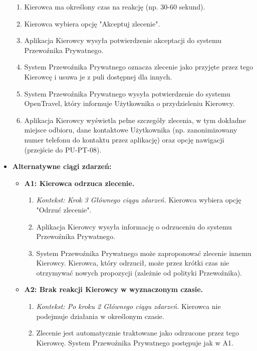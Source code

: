 \documentclass[a4paper,12pt]{article}
\begin{document}
\begin{itemize}
\begin{enumerate}
            \item Kierowca ma określony czas na reakcję (np. 30-60 sekund).
            \item Kierowca wybiera opcję "Akceptuj zlecenie".
            \item Aplikacja Kierowcy wysyła potwierdzenie akceptacji do systemu Przewoźnika Prywatnego.
            \item System Przewoźnika Prywatnego oznacza zlecenie jako przyjęte przez tego Kierowcę i usuwa je z puli dostępnej dla innych.
            \item System Przewoźnika Prywatnego wysyła potwierdzenie do systemu OpenTravel, który informuje Użytkownika o przydzieleniu Kierowcy.
            \item Aplikacja Kierowcy wyświetla pełne szczegóły zlecenia, w tym dokładne miejsce odbioru, dane kontaktowe Użytkownika (np. zanonimizowany numer telefonu do kontaktu przez aplikację) oraz opcję nawigacji (przejście do PU-PT-08).
        \end{enumerate}
    \item \textbf{Alternatywne ciągi zdarzeń:}
        \begin{itemize}
            \item \textbf{A1: Kierowca odrzuca zlecenie.}
                \begin{enumerate}
                    \item \textit{Kontekst: Krok 3 Głównego ciągu zdarzeń.} Kierowca wybiera opcję "Odrzuć zlecenie".
                    \item Aplikacja Kierowcy wysyła informację o odrzuceniu do systemu Przewoźnika Prywatnego.
                    \item System Przewoźnika Prywatnego może zaproponować zlecenie innemu Kierowcy. Kierowca, który odrzucił, może przez krótki czas nie otrzymywać nowych propozycji (zależnie od polityki Przewoźnika).
                \end{enumerate}
            \item \textbf{A2: Brak reakcji Kierowcy w wyznaczonym czasie.}
                \begin{enumerate}
                    \item \textit{Kontekst: Po kroku 2 Głównego ciągu zdarzeń.} Kierowca nie podejmuje działania w określonym czasie.
                    \item Zlecenie jest automatycznie traktowane jako odrzucone przez tego Kierowcę. System Przewoźnika Prywatnego postępuje jak w A1.
                \end{enumerate}

\end{itemize}
\end{itemize}
\end{document}

